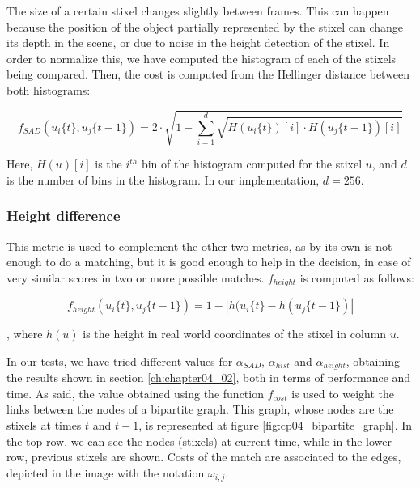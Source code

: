 The size of a certain stixel changes slightly between frames. This can happen because the position of the object partially represented by the stixel can change its depth in the scene, or due to noise in the height detection of the stixel. In order to normalize this, we have computed the histogram of each of the stixels being compared. Then, the cost is computed from the Hellinger distance between both histograms:

\begin{equation}\label{eq:cp04_stixel_movement_histograms_cost}
f_{SAD}(u_i\{t\}, u_j\{t - 1\}) = 2 \cdot \sqrt { 1 - \underset{i=1}{\overset{d}{\sum}}\sqrt{H(u_i\{t\})[i] \cdot H(u_j\{t - 1\})[i]}}
\end{equation}

Here, $H(u)[i]$ is the $i^{th}$ bin of the histogram computed for the stixel $u$, and $d$ is the number of bins in the histogram. In our implementation, $d = 256$.

\subsubsection{Height difference}\label{ch:chapter04_01_03_01_05}

This metric is used to complement the other two metrics, as by its own is not enough to do a matching, but it is good enough to help in the decision, in case of very similar scores in two or more possible matches. $f_{height}$ is computed as follows:

\begin{equation}\label{eq:cp04_stixel_movement_height_cost}
f_{height}(u_i\{t\}, u_j\{t - 1\}) = 1 - |h(u_i\{t\} - h(u_j\{t - 1\})|
\end{equation}

, where $h(u)$ is the height in real world coordinates of the stixel in column $u$. 

In our tests, we have tried different values for $\alpha_{SAD}$, $\alpha_{hist}$ and $\alpha_{height}$, obtaining the results shown in section \ref{ch:chapter04_02}, both in terms of performance and time. As said, the value obtained using the function $f_{cost}$ is used to weight the links between the nodes of a bipartite graph. This graph, whose nodes are the stixels at times $t$ and $t - 1$, is represented at figure \ref{fig:cp04_bipartite_graph}. In the top row, we can see the nodes (stixels) at current time, while in the lower row, previous stixels are shown. Costs of the match are associated to the edges, depicted in the image with the notation $\omega_{i,j}$.


